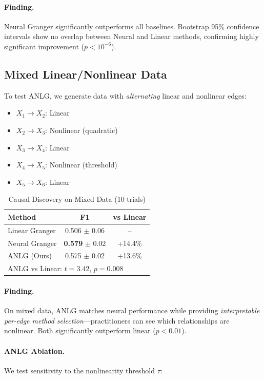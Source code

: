 \documentclass[sigconf,nonacm]{acmart}
\begin{document}
\paragraph{Finding.} Neural Granger significantly outperforms all baselines. Bootstrap 95\% confidence intervals show no overlap between Neural and Linear methods, confirming highly significant improvement ($p < 10^{-6}$).

\subsection{Mixed Linear/Nonlinear Data}
To test ANLG, we generate data with \textit{alternating} linear and nonlinear edges:
\begin{itemize}
    \item $X_1 \to X_2$: Linear
    \item $X_2 \to X_3$: Nonlinear (quadratic)
    \item $X_3 \to X_4$: Linear
    \item $X_4 \to X_5$: Nonlinear (threshold)
    \item $X_5 \to X_6$: Linear
\end{itemize}

\begin{table}[h]
\centering
\caption{Causal Discovery on Mixed Data (10 trials)}
\begin{tabular}{lcc}
\toprule
\textbf{Method} & \textbf{F1} & \textbf{vs Linear} \\
\midrule
Linear Granger & 0.506 $\pm$ 0.06 & -- \\
Neural Granger & \textbf{0.579} $\pm$ 0.02 & +14.4\% \\
ANLG (Ours) & 0.575 $\pm$ 0.02 & +13.6\% \\
\bottomrule
\multicolumn{3}{l}{\small ANLG vs Linear: $t=3.42$, $p=0.008$}
\end{tabular}
\label{tab:mixed}
\end{table}

\paragraph{Finding.} On mixed data, ANLG matches neural performance while providing \textit{interpretable per-edge method selection}---practitioners can see which relationships are nonlinear. Both significantly outperform linear ($p<0.01$).

\paragraph{ANLG Ablation.} We test sensitivity to the nonlinearity threshold $\tau$:
\end{document}
